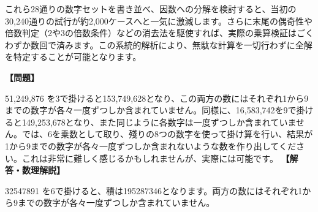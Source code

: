\documentclass[10pt,a4paper,oneside,openany]{ltjsbook}
\begin{document}
\begin{tcolorbox}[colback=softblue,colframe=primaryblue,title=\textbf{第 85 問：辻馬車の番号（全桁数字の最大積） （原題: THE CAB NUMBERS.）},arc=2mm,boxrule=1pt,breakable]
これら28通りの数字セットを書き並べ、因数への分解を検討すると、当初の30,240通りの試行が約2,000ケースへと一気に激減します。さらに末尾の偶奇性や倍数判定（2や3の倍数条件）などの消去法を駆使すれば、実際の乗算検証はごくわずか数回で済みます。この系統的解析により、無駄な計算を一切行わずに全解を特定することが可能となります。
\end{tcolorbox}

\begin{tcolorbox}[colback=softblue,colframe=primaryblue,title=\textbf{第 86 問：queer multiplication （原題: QUEER MULTIPLICATION.）},arc=2mm,boxrule=1pt,breakable]
\textbf{【問題】}\par\vspace{0.3em}
51,249,876 を3で掛けると153,749,628となり、この両方の数にはそれぞれ1から9までの数字が各々一度ずつしか含まれていません。同様に、16,583,742を9で掛けると149,253,678となり、また同じように各数字は一度ずつしか含まれていません。では、6を乗数として取り、殘りの8つの数字を使って掛け算を行い、結果が1から9までの数字が各々一度ずつしか含まれないような数を作り出してください。これは非常に難しく感じるかもしれませんが、実際には可能です。
\tcblower
\textbf{【解答・数理解説】}\par\vspace{0.3em}
32547891 を6で掛けると、積は195287346となります。両方の数にはそれぞれ1から9までの数字が各々一度ずつしか含まれていません。
\end{tcolorbox}
\end{document}
